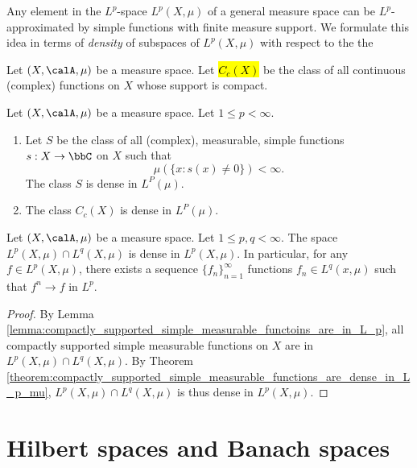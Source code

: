 Any element in the $L^p$-space $L^p(X, \mu)$ of a general measure space can be $L^p$-approximated by simple functions with finite measure support. We formulate this idea in terms of \emph{density} of subspaces of $L^p(X, \mu)$ with respect to the  the 

\begin{notation}
    Let $(X,\calA, \mu)$ be a measure space. Let \hl{$C_c(X)$} be the class of all continuous (complex) functions on $X$ whose support is compact. 
\end{notation}

\begin{theorem} \label{theorem:compactly_supported_simple_measurable_functions_are_dense_in_L_p_mu}
    Let $(X,\calA, \mu)$ be a measure space. Let $1 \leq p < \infty$.
    \begin{enumerate}
        \item Let $S$ be the class of all (complex), measurable, simple functions $s: X \to \bbC$ on $X$ such that
        $$ \mu(\{x: s(x) \neq 0\})<\infty.$$
        The class $S$ is dense in $L^{P}(\mu)$.
        \item  The class $C_c(X)$ is dense in $L^{P}(\mu)$.
    \end{enumerate} 
\end{theorem}

\begin{corollary} \label{corollary:intersection_of_L_p_s_is_dense_in_L_p}
    Let $(X, \calA, \mu)$ be a measure space. Let $1 \leq p,q < \infty$. The space $L^p(X, \mu) \cap L^q(X, \mu)$ is dense in $L^p (X, \mu)$. In particular, for any $f \in L^p(X,\mu)$, there exists a sequence $\{f_n\}_{n=1}^\infty$ functions $f_n \in L^q(x,\mu)$ such that $f^n \to f$ in $L^p$.
\end{corollary}
\begin{proof}
    By Lemma \ref{lemma:compactly_supported_simple_measurable_functoins_are_in_L_p}, all compactly supported simple measurable functions on $X$ are in $L^p(X,\mu) \cap L^q(X,\mu)$. By Theorem \ref{theorem:compactly_supported_simple_measurable_functions_are_dense_in_L_p_mu}, $L^p(X,\mu) \cap L^q(X,\mu)$ is thus dense in $L^p(X,\mu)$.
\end{proof}

\section{Hilbert spaces and Banach spaces}

